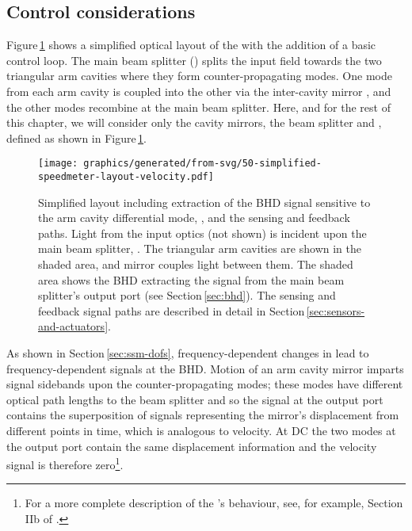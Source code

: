 \subsection{\label{sec:simple-control}Control considerations}
Figure\,\ref{fig:simplified-speedmeter-layout-velocity} shows a simplified optical layout of the \SSMEXPT{} with the addition of a basic control loop. The main beam splitter (\MSIX{}) splits the input field towards the two triangular arm cavities where they form counter-propagating modes. One mode from each arm cavity is coupled into the other via the inter-cavity mirror \MNINE{}, and the other modes recombine at the main beam splitter. Here, and for the rest of this chapter, we will consider only the cavity mirrors, the beam splitter and \MNINE{}, defined as shown in Figure\,\ref{fig:simplified-speedmeter-layout-velocity}.

\begin{figure}
  \centering
  \texttt{[image: graphics/generated/from-svg/50-simplified-speedmeter-layout-velocity.pdf]}
  \caption[Simplified layout of the \SSMEXPT{} including a basic velocity feedback loop]{\label{fig:simplified-speedmeter-layout-velocity}Simplified \SSM{} layout including extraction of the BHD signal sensitive to the arm cavity differential mode, \LMINUS{}, and the sensing and feedback paths. Light from the input optics (not shown) is incident upon the main beam splitter, \MSIX{}. The triangular arm cavities are shown in the shaded  area, and mirror \MNINE{} couples light between them. The shaded  area shows the BHD extracting the signal from the main beam splitter's output port (see Section\,\ref{sec:bhd}). The sensing and feedback signal paths are described in detail in Section\,\ref{sec:sensors-and-actuators}.}
\end{figure}

As shown in Section\,\ref{sec:ssm-dofs}, frequency-dependent changes in \LMINUS{} lead to frequency-dependent signals at the \gls{BHD}. Motion of an arm cavity mirror imparts signal sidebands upon the counter-propagating modes; these modes have different optical path lengths to the beam splitter and so the signal at the output port contains the superposition of signals representing the mirror's displacement from different points in time, which is analogous to velocity. At \gls{DC} the two modes at the output port contain the same displacement information and the velocity signal is therefore zero\footnote{For a more complete description of the \SSM{}'s behaviour, see, for example, Section\,IIb of \cite{Chen2003}.}.

